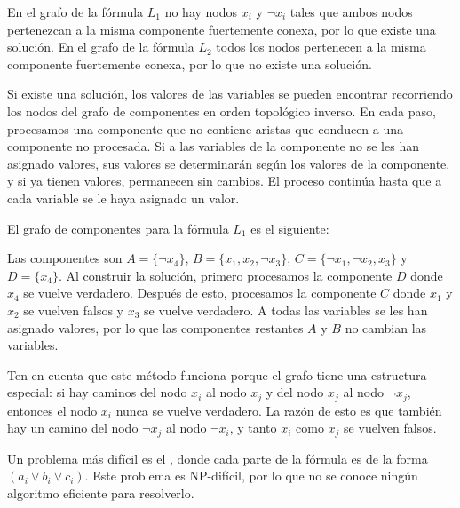 En el grafo de la fórmula $L_1$
no hay nodos $x_i$ y $\lnot x_i$
tales que ambos nodos
pertenezcan a la misma componente fuertemente conexa,
por lo que existe una solución.
En el grafo de la fórmula $L_2$
todos los nodos pertenecen a la misma componente fuertemente conexa,
por lo que no existe una solución.

Si existe una solución, los valores de las variables
se pueden encontrar recorriendo los nodos del
grafo de componentes en orden topológico inverso.
En cada paso, procesamos una componente
que no contiene aristas que conducen a una
componente no procesada.
Si a las variables de la componente
no se les han asignado valores,
sus valores se determinarán
según los valores de la componente,
y si ya tienen valores,
permanecen sin cambios.
El proceso continúa hasta que a cada variable
se le haya asignado un valor.

El grafo de componentes para la fórmula $L_1$ es el siguiente:
\begin{center}
\end{center}

Las componentes son
$A = \{\lnot x_4\}$,
$B = \{x_1, x_2, \lnot x_3\}$,
$C = \{\lnot x_1, \lnot x_2, x_3\}$ y
$D = \{x_4\}$.
Al construir la solución,
primero procesamos la componente $D$
donde $x_4$ se vuelve verdadero.
Después de esto, procesamos la componente $C$
donde $x_1$ y $x_2$ se vuelven falsos
y $x_3$ se vuelve verdadero.
A todas las variables se les han asignado valores,
por lo que las componentes restantes $A$ y $B$
no cambian las variables.

Ten en cuenta que este método funciona porque el
grafo tiene una estructura especial:
si hay caminos del nodo $x_i$ al nodo $x_j$
y del nodo $x_j$ al nodo $\lnot x_j$,
entonces el nodo $x_i$ nunca se vuelve verdadero.
La razón de esto es que también hay
un camino del nodo $\lnot x_j$ al nodo $\lnot x_i$,
y tanto $x_i$ como $x_j$ se vuelven falsos.


Un problema más difícil es el ,
donde cada parte de la fórmula es de la forma
$(a_i \lor b_i \lor c_i)$.
Este problema es NP-difícil, por lo que no se conoce ningún
algoritmo eficiente para resolverlo.
